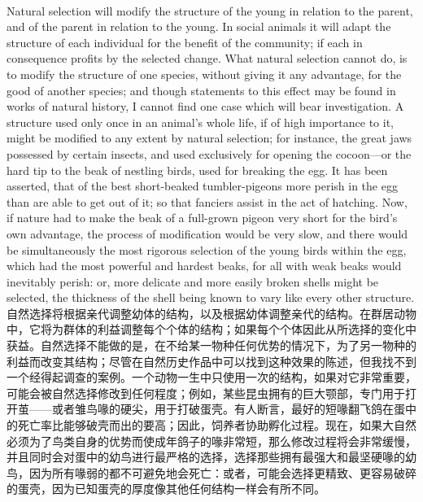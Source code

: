 \documentclass{article}
\begin{document}
\\
Natural selection will modify the structure of the young in relation to the parent, and of the parent in relation to the young. In social animals it will adapt the structure of each individual for the benefit of the community; if each in consequence profits by the selected change. What natural selection cannot do, is to modify the structure of one species, without giving it any advantage, for the good of another species; and though statements to this effect may be found in works of natural history, I cannot find one case which will bear investigation. A structure used only once in an animal’s whole life, if of high importance to it, might be modified to any extent by natural selection; for instance, the great jaws possessed by certain insects, and used exclusively for opening the cocoon—or the hard tip to the beak of nestling birds, used for breaking the egg. It has been asserted, that of the best short-beaked tumbler-pigeons more perish in the egg than are able to get out of it; so that fanciers assist in the act of hatching. Now, if nature had to make the beak of a full-grown pigeon very short for the bird’s own advantage, the process of modification would be very slow, and there would be simultaneously the most rigorous selection of the young birds within the egg, which had the most powerful and hardest beaks, for all with weak beaks would inevitably perish: or, more delicate and more easily broken shells might be selected, the thickness of the shell being known to vary like every other structure.\\
自然选择将根据亲代调整幼体的结构，以及根据幼体调整亲代的结构。在群居动物中，它将为群体的利益调整每个个体的结构；如果每个个体因此从所选择的变化中获益。自然选择不能做的是，在不给某一物种任何优势的情况下，为了另一物种的利益而改变其结构；尽管在自然历史作品中可以找到这种效果的陈述，但我找不到一个经得起调查的案例。一个动物一生中只使用一次的结构，如果对它非常重要，可能会被自然选择修改到任何程度；例如，某些昆虫拥有的巨大颚部，专门用于打开茧——或者雏鸟喙的硬尖，用于打破蛋壳。有人断言，最好的短喙翻飞鸽在蛋中的死亡率比能够破壳而出的要高；因此，饲养者协助孵化过程。现在，如果大自然必须为了鸟类自身的优势而使成年鸽子的喙非常短，那么修改过程将会非常缓慢，并且同时会对蛋中的幼鸟进行最严格的选择，选择那些拥有最强大和最坚硬喙的幼鸟，因为所有喙弱的都不可避免地会死亡：或者，可能会选择更精致、更容易破碎的蛋壳，因为已知蛋壳的厚度像其他任何结构一样会有所不同。
\end{document}
